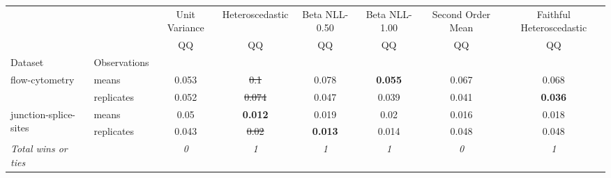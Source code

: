 \begin{tabular}{ll|c|c|c|c|c|c}
\toprule
{} & {} & {Unit Variance} & {Heteroscedastic} & {Beta NLL-0.50} & {Beta NLL-1.00} & {Second Order Mean} & {Faithful Heteroscedastic} \\
{} & {} & {QQ} & {QQ} & {QQ} & {QQ} & {QQ} & {QQ} \\
{Dataset} & {Observations} & {} & {} & {} & {} & {} & {} \\
\midrule
\multirow[t]{2}{*}{flow-cytometry} & means & 0.053 & \sout{0.1} & 0.078 & \textbf{0.055} & 0.067 & 0.068 \\
 & replicates & 0.052 & \sout{0.074} & 0.047 & 0.039 & 0.041 & \textbf{0.036} \\
\multirow[t]{2}{*}{junction-splice-sites} & means & 0.05 & \textbf{0.012} & 0.019 & 0.02 & 0.016 & 0.018 \\
 & replicates & 0.043 & \sout{0.02} & \textbf{0.013} & 0.014 & 0.048 & 0.048 \\
\textit{{Total wins or ties}} &  & \textit{0} & \textit{1} & \textit{1} & \textit{1} & \textit{0} & \textit{1} \\
\bottomrule
\end{tabular}
